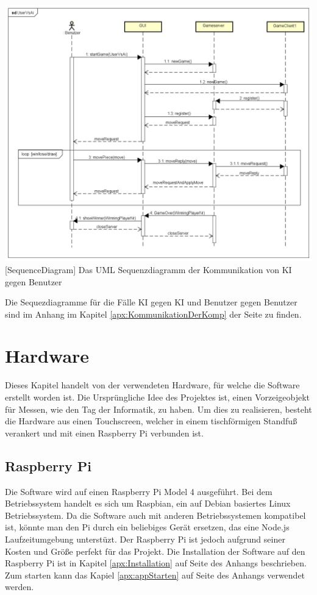 \documentclass[12pt,a4paper,bibliography=totocnumbered,listof=totocnumbered]{article}
\begin{document}
\vspace{1em}
\begin{minipage}{\linewidth}
	\centering
	\includegraphics[width=0.83\linewidth]{pics/UserVsAiCommunication.png}
	[SequenceDiagram]{ Das UML Sequenzdiagramm der Kommunikation von KI gegen Benutzer}
	\label{fig:UserVsUserSequenceDiagram}
\end{minipage}

Die Sequezdiagramme für die Fälle KI gegen KI und Benutzer gegen Benutzer sind im Anhang im Kapitel \ref{apx:KommunikationDerKomp} 
der Seite \pageref{apx:KommunikationDerKomp} zu finden.

\pagebreak
\section{Hardware}
Dieses Kapitel handelt von der verwendeten Hardware, für welche die Software erstellt worden ist. 
Die Ursprüngliche Idee des Projektes ist, einen Vorzeigeobjekt für Messen, wie den Tag der Informatik, zu haben.
Um dies zu realisieren, besteht die Hardware aus einen Touchscreen, welcher in einem tischförmigen Standfuß verankert 
und mit einen Raspberry Pi verbunden ist.

\subsection{Raspberry Pi}
Die Software wird auf einen Raspberry Pi Model 4 ausgeführt. Bei dem Betriebssystem handelt es sich um 
Raspbian, ein auf Debian basiertes Linux Betriebssystem. \cite{RaspberryPi} Da die Software auch mit anderen Betriebssystemen
kompatibel ist, könnte man den Pi durch ein beliebiges Gerät ersetzen, das eine Node.js Laufzeitumgebung unterstüzt.
Der Raspberry Pi ist jedoch aufgrund seiner Kosten und Größe perfekt für das Projekt.
Die Installation der Software auf den Raspberry Pi ist in Kapitel \ref{apx:Installation} auf Seite \pageref{apx:Installation} des Anhangs beschrieben.
Zum starten kann das Kapiel \ref{apx:appStarten} auf Seite \pageref{apx:appStarten} des Anhangs verwendet werden.
\end{document}
